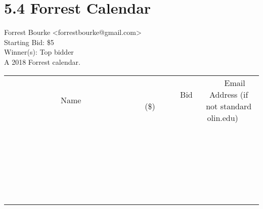\documentclass[11pt]{article}
\begin{document}
					\section*{5.4 Forrest Calendar}
					Forrest Bourke <forrestbourke@gmail.com> \\
					Starting Bid: \$5 \\
					Winner(s): Top bidder \\
					A 2018 Forrest calendar. \\
					[6ex]
					\begin{tabular}{c c c}
						~~~~~~~~~~~~~Name~~~~~~~~~~~~~ & ~~~~~~~~~Bid (\$)~~~~~~~~~ & ~~~Email Address (if not standard olin.edu)~~~ \\
				
 & & \\
\hline
 & & \\
\hline
 & & \\
\hline
 & & \\
\hline
 & & \\
\hline
 & & \\
\hline
 & & \\
\hline
 & & \\
\hline
 & & \\
\hline
 & & \\
\hline
 & & \\
\hline
 & & \\
\hline
 & & \\
\hline
 & & \\
\hline
 & & \\
\hline
 & & \\
\hline
 & & \\
\hline
 & & \\
\hline
 & & \\
\hline
 & & \\
\hline
 & & \\
\hline
 & & \\
\hline
 & & \\
\hline
 & & \\
\hline
 & & \\
\hline
 & & \\
\hline
					\end{tabular}
					\clearpage
				
\end{document}
